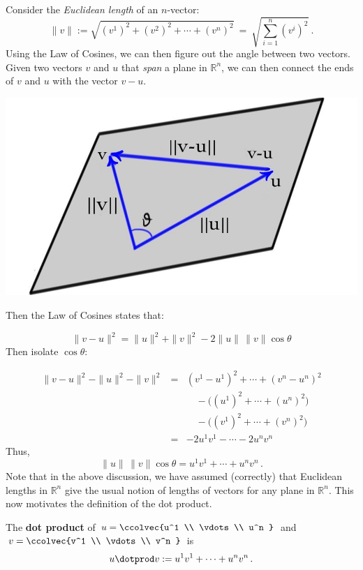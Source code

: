Consider the {\itshape Euclidean length} of an $n$-vector: 
\[
\|v\| := \sqrt{(v^1)^2 + (v^2)^2+\cdots+(v^n)^2}\ =\ \sqrt{ \sum_{i=1}^n (v^i)^2 }\: .
\]
Using the Law of Cosines, we can then figure out the angle between two vectors.  Given two vectors $v$ and $u$ that {\itshape span} a plane in $\mathbb{R}^n$, we can then connect the ends of $v$ and $u$ with the vector $v-u$. 
 \begin{center}
\includegraphics[scale=.24]{triangleineq.jpg}
\end{center}
Then the Law of Cosines states that:

\[ 
\|v-u\|^2 = \|u\|^2 + \|v\|^2 - 2\|u\|\,  \|v\| \cos \theta 
\]
Then isolate $\cos \theta$:

\begin{eqnarray*}
\|v-u\|^2 - \|u\|^2 - \|v\|^2 &=& (v^1-u^1)^2 + \cdots + (v^n-u^n)^2 \\
& & \quad - \big((u^1)^2 + \cdots + (u^n)^2\big) \\
& & \quad - \big((v^1)^2 + \cdots + (v^n)^2\big) \\
& = & -2 u^1v^1 - \cdots - 2u^nv^n
\end{eqnarray*}
Thus, 
\[
\|u\|\, \|v\| \cos \theta = u^1v^1 + \cdots + u^nv^n\, .
\]
Note that in the above discussion, we have assumed (correctly) that Euclidean lengths in ${\mathbb R}^n$
give the usual notion of lengths of vectors for any plane in ${\mathbb R}^n$. This now motivates the definition of the dot product.

\begin{definition} 
The {\bf dot product} of $u=\ccolvec{u^1 \\ \vdots \\ u^n }$ and $v=\ccolvec{v^1 \\ \vdots \\ v^n }$ is 
\[u\dotprod v := u^1v^1 + \cdots + u^nv^n\, .\]
\end{definition} 

